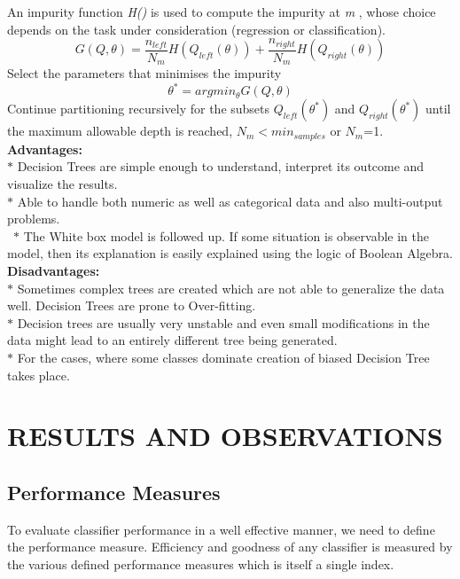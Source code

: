\documentclass[a4paper, 10pt, conference]{IEEEtran}
\begin{document}
An impurity function \textit{H()} is used to compute the impurity at \textit{m} , whose choice depends on the task under consideration (regression or classification).
\[ G(Q,\theta) = \frac{n_{left}}{N_{m}}H(Q_{left}(\theta)) + \frac{n_{right}}{N_{m}}H(Q_{right}(\theta))
\]
Select the parameters that minimises the impurity
\[ \theta^{\ast} = arg min_{\theta}G(Q,\theta)
\]
Continue partitioning recursively for the subsets \textit{$Q_{left}(\theta^{\ast})$} and \textit{$Q_{right}(\theta^{\ast})$} until the maximum allowable depth is reached, \textit{$N_{m}< min_{samples}$} or \textit{$N_{m}$}=1.
\\

\textbf{Advantages:}\\
\indent $\ast$ Decision Trees are simple enough to understand, interpret its outcome and visualize the results.\\
\indent $\ast$ Able to handle both numeric as well as categorical data and also multi-output problems.\\\
\indent $\ast$ The White box model is followed up. If some situation is observable in the model, then its explanation is easily explained using the logic of Boolean Algebra.\\

\textbf{Disadvantages:}\\
\indent $\ast$ Sometimes complex trees are created which are not able to generalize the data well. Decision Trees are prone to Over-fitting.\\
\indent $\ast$ Decision trees are usually very unstable and even small modifications in the data might lead to an entirely different tree being generated.\\
\indent $\ast$ For the cases, where some classes dominate creation of biased Decision Tree takes place.\\


\section{RESULTS AND OBSERVATIONS}

\subsection{Performance Measures}
To evaluate classifier performance in a well effective manner, we need to define the performance measure. Efficiency and goodness of any classifier is measured by the various defined performance measures which is itself a single index.
\end{document}
